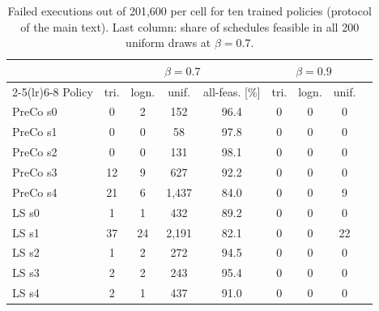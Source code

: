 \begin{table}[htbp]
\centering
\caption{Failed executions out of 201{,}600 per cell for ten trained policies (protocol of the main text). Last column: share of schedules feasible in all 200 uniform draws at $\beta=0.7$.}
\label{tab:credseeds}
\scriptsize
\setlength{\tabcolsep}{2.2pt}
\begin{tabular}{lcccccccc}
\toprule
 & \multicolumn{4}{c}{$\beta=0.7$} & \multicolumn{3}{c}{$\beta=0.9$} \\
\cmidrule(lr){2-5}\cmidrule(lr){6-8}
Policy & tri. & logn. & unif. & all-feas. [\%] & tri. & logn. & unif. \\
\midrule
PreCo s0 & 0 & 2 & 152 & 96.4 & 0 & 0 & 0 \\
PreCo s1 & 0 & 0 & 58 & 97.8 & 0 & 0 & 0 \\
PreCo s2 & 0 & 0 & 131 & 98.1 & 0 & 0 & 0 \\
PreCo s3 & 12 & 9 & 627 & 92.2 & 0 & 0 & 0 \\
PreCo s4 & 21 & 6 & 1{,}437 & 84.0 & 0 & 0 & 9 \\
LS s0 & 1 & 1 & 432 & 89.2 & 0 & 0 & 0 \\
LS s1 & 37 & 24 & 2{,}191 & 82.1 & 0 & 0 & 22 \\
LS s2 & 1 & 2 & 272 & 94.5 & 0 & 0 & 0 \\
LS s3 & 2 & 2 & 243 & 95.4 & 0 & 0 & 0 \\
LS s4 & 2 & 1 & 437 & 91.0 & 0 & 0 & 0 \\
\bottomrule
\end{tabular}
\end{table}
